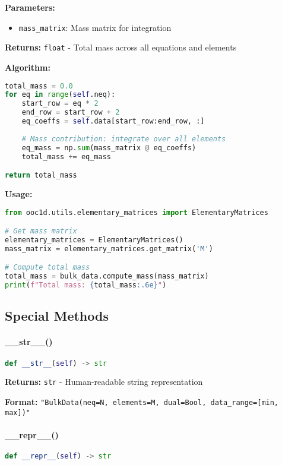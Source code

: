 \textbf{Parameters:}
\begin{itemize}
    \item \texttt{mass\_matrix}: Mass matrix for integration
\end{itemize}

\textbf{Returns:} \texttt{float} - Total mass across all equations and elements

\textbf{Algorithm:}
\begin{lstlisting}[language=Python, caption=Mass Computation Algorithm]
total_mass = 0.0
for eq in range(self.neq):
    start_row = eq * 2
    end_row = start_row + 2
    eq_coeffs = self.data[start_row:end_row, :]
    
    # Mass contribution: integrate over all elements
    eq_mass = np.sum(mass_matrix @ eq_coeffs)
    total_mass += eq_mass

return total_mass
\end{lstlisting}

\textbf{Usage:}
\begin{lstlisting}[language=Python, caption=Mass Computation Usage]
from ooc1d.utils.elementary_matrices import ElementaryMatrices

# Get mass matrix
elementary_matrices = ElementaryMatrices()
mass_matrix = elementary_matrices.get_matrix('M')

# Compute total mass
total_mass = bulk_data.compute_mass(mass_matrix)
print(f"Total mass: {total_mass:.6e}")
\end{lstlisting}

\subsection{Special Methods}
\label{subsec:special_methods}

\paragraph{\_\_str\_\_()}\leavevmode
\begin{lstlisting}[language=Python, caption=String Representation Method]
def __str__(self) -> str
\end{lstlisting}

\textbf{Returns:} \texttt{str} - Human-readable string representation

\textbf{Format:} \texttt{"BulkData(neq=N, elements=M, dual=Bool, data\_range=[min, max])"}

\paragraph{\_\_repr\_\_()}\leavevmode
\begin{lstlisting}[language=Python, caption=Repr Method]
def __repr__(self) -> str
\end{lstlisting}

